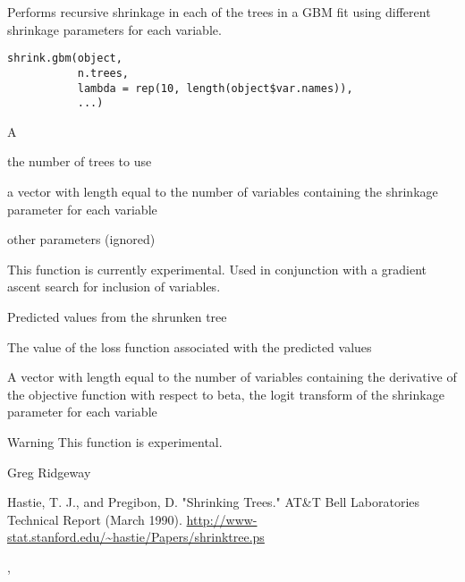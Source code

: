 \begin{Description}\relax
Performs recursive shrinkage in each of the trees in a GBM fit using different shrinkage parameters for each variable.
\end{Description}
\begin{Usage}
\begin{verbatim}
shrink.gbm(object, 
           n.trees, 
           lambda = rep(10, length(object$var.names)), 
           ...)
\end{verbatim}
\end{Usage}
\begin{Arguments}
\begin{ldescription}
\item[\code{object}] A  
\item[\code{n.trees}] the number of trees to use 
\item[\code{lambda}] a vector with length equal to the number of variables containing the shrinkage parameter for each variable 
\item[\code{...}] other parameters (ignored) 
\end{ldescription}
\end{Arguments}
\begin{Details}\relax
This function is currently experimental. Used in conjunction with a gradient ascent search for inclusion of variables.
\end{Details}
\begin{Value}
\begin{ldescription}
\item[\code{predF}] Predicted values from the shrunken tree
\item[\code{objective}] The value of the loss function associated with the predicted values
\item[\code{gradient}] A vector with length equal to the number of variables containing the derivative of the objective function with respect to beta, the logit transform of the shrinkage parameter for each variable
\end{ldescription}
\end{Value}
\begin{Section}{Warning}
This function is experimental.
\end{Section}
\begin{Author}\relax
Greg Ridgeway 
\end{Author}
\begin{References}\relax
Hastie, T. J., and Pregibon, D. "Shrinking Trees." AT\&T Bell Laboratories Technical Report (March 1990). \url{http://www-stat.stanford.edu/~hastie/Papers/shrinktree.ps}
\end{References}
\begin{SeeAlso}\relax
{}, 
\end{SeeAlso}


